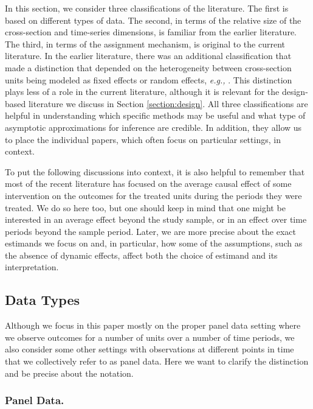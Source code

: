 \documentclass[letterpaper,12pt,leqno]{article}
\begin{document}
In this section, we consider three classifications of the literature. The first is based on different types of data.
The second, in terms of the relative size of the cross-section and time-series dimensions,  is familiar from the earlier literature. The third, in terms of the assignment mechanism, is original to the current literature. In the earlier literature, there was an additional classification that made a distinction that depended on the heterogeneity between cross-section units being modeled as {fixed effects} or {random effects}, {\it e.g.,} \citep{chamberlain1984panel}. This distinction plays less of a role in the current literature, although it is relevant for the design-based literature we discuss in Section \ref{section:design}.
All three classifications are helpful in understanding which specific methods may be useful and what type of asymptotic approximations for inference are credible. In addition, they allow us to place the individual papers, which often focus on particular settings, in context.

To put the following discussions into context, it is also helpful to remember that most of the recent literature has focused on the average causal effect of some intervention on the outcomes for the treated units during the periods they were treated. We do so here too, but one should keep in mind that one might be interested in an average effect beyond the study sample, or in an effect over  time periods beyond the sample period.
Later, we are more precise about the exact estimands we focus on and, in particular, how some of the assumptions, such as the absence of dynamic effects, affect both the choice of estimand and its interpretation.

\subsection{Data Types}\label{datatypes}

Although we focus in this paper mostly on the proper panel data setting where we observe outcomes for a number of units over a number of time periods, we also consider some other settings with observations at different points in time that we collectively refer to as panel data. Here we want to clarify the distinction and be precise about the notation.

\subsubsection{Panel Data.}\label{panel}
\end{document}
